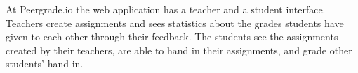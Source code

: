 \begin{example}
\label{example:peergrade-split-interface}
At Peergrade.io the web application has a teacher and a student interface. Teachers create assignments and sees statistics about the grades students have given to each other through their feedback. The students see the assignments created by their teachers, are able to hand in their assignments, and grade other students' hand in.
\end{example}















